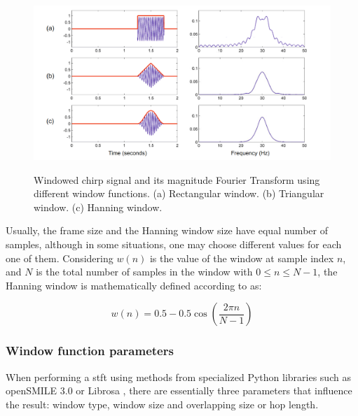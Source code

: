 \begin{figure}[htbp]
    \raggedright
        \caption{Windowed chirp signal and its magnitude Fourier Transform using different window functions. (a) Rectangular window. (b) Triangular window. (c) Hanning window.}
        \includegraphics[width=1.0\textwidth]{resources/images/030-theoretical_framework/Framework_windows_stft_examples.png}
        \label{fig:frmwk_windows_stft_example}
\end{figure}

Usually, the frame size and the Hanning window size have equal number of samples, although in some situations, one may choose different values for each one of them. Considering $w(n)$ is the value of the window at sample index $n$, and $N$ is the total number of samples in the window with $0 \leq n \leq N-1$, the Hanning window is mathematically defined according to \textcite{Smith2013} as:

\begin{equation}
    \label{eq:frmwk_windows_stft}
    w(n) = 0.5 - 0.5 \cos\left(\frac{2 \pi n}{N-1}\right)
\end{equation}


\subsubsection{Window function parameters}
\label{subsubsec:audio_fundamentals_window_function_parameters}

When performing a \gls{stft} using methods from specialized Python libraries such as openSMILE 3.0 \cite{Eyben2010} or  Librosa \cite{McFee2015librosa_conf}, there are essentially three parameters that influence the result: window type, window size and overlapping size or hop length.

